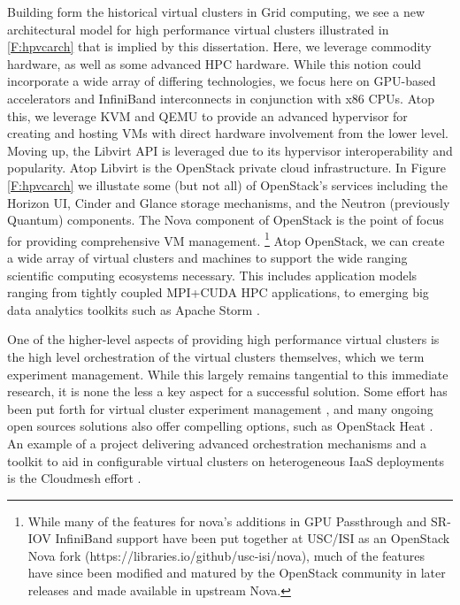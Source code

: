 Building form the historical virtual clusters in Grid computing, we see a new architectural model for high performance virtual clusters illustrated in \ref{F:hpvcarch} that is implied by this dissertation.  Here, we leverage commodity hardware, as well as some advanced HPC hardware. While this notion could incorporate a wide array of differing technologies, we focus here on GPU-based accelerators and InfiniBand interconnects in conjunction with x86 CPUs. Atop this, we leverage KVM and QEMU to provide an advanced hypervisor for creating and hosting VMs with direct hardware involvement from the lower level. Moving up, the Libvirt API is leveraged due to its hypervisor interoperability and popularity. Atop Libvirt is the OpenStack private cloud infrastructure. In Figure \ref{F:hpvcarch} we illustate some (but not all) of OpenStack's services including the Horizon UI, Cinder and Glance storage mechanisms, and the Neutron (previously Quantum) components. The Nova component of OpenStack is the point of focus for providing comprehensive VM management.
\footnote{While many of the features for nova's additions in GPU Passthrough and SR-IOV InfiniBand support have been put together at USC/ISI as an OpenStack Nova fork (https://libraries.io/github/usc-isi/nova), much of the features have since been modified and matured by the OpenStack community in later releases and made available in upstream Nova.}  Atop OpenStack, we can create a wide array of virtual clusters and machines to support the wide ranging scientific computing ecosystems necessary. This includes application models ranging from tightly coupled MPI+CUDA HPC applications, to emerging big data analytics toolkits such as Apache Storm \cite{kamburugamuve2016streaming}. 

One of the higher-level aspects of providing high performance virtual clusters is the high level orchestration of the virtual clusters themselves, which we term experiment management. While this largely remains tangential to this immediate research, it is none the less a key aspect for a successful solution. Some effort has been put forth for virtual cluster experiment management \cite{las2010gce}, and many ongoing open sources solutions also offer compelling options, such as OpenStack Heat \cite{www-openstack-heat}.  An example of a project delivering advanced orchestration mechanisms and a toolkit to aid in configurable virtual clusters on heterogeneous IaaS deployments is the Cloudmesh effort \cite{von2014cloudmesh}.  


